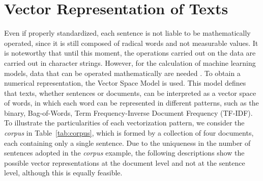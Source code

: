 \documentclass{ieeeaccess}
\begin{document}

\section{Vector Representation of Texts}
\label{sec:vetorização}

Even if properly standardized, each sentence is not liable to be mathematically operated, since it is still composed of radical words and not measurable values. It is noteworthy that until this moment, the operations carried out on the data are carried out in character strings. However, for the calculation of machine learning models, data that can be operated mathematically are needed . To obtain a numerical representation, the Vector Space Model is used. This model defines that texts, whether sentences or documents, can be interpreted as a vector space of words, in which each word can be represented in different patterns, such as the binary, Bag-of-Words, Term Frequency-Inverse Document Frequency (TF-IDF). To illustrate the particularities of each vectorization pattern, we consider the \textit{corpus} in Table~\ref{tab:corpus}, which is formed by a collection of four documents, each containing only a single sentence. Due to the uniqueness in the number of sentences adopted in the \textit{corpus} example, the following descriptions show the possible vector representations at the document level and not at the sentence level, although this is equally feasible.
\end{document}
